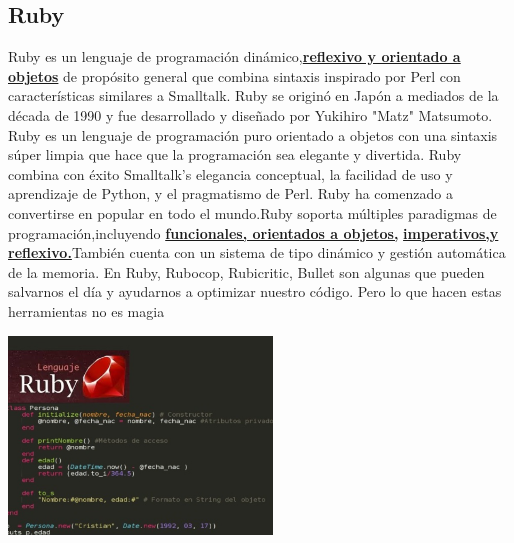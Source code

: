 \documentclass[twoside,twocolumn]{article}
\begin{document}
\subsection{Ruby}
Ruby es un lenguaje de programación dinámico,{\bf \underline {reflexivo y orientado a objetos}}  de propósito general que combina sintaxis
inspirado por Perl con características similares a Smalltalk. Ruby se originó en Japón a mediados de la década de 1990 y fue
desarrollado y diseñado por Yukihiro "Matz" Matsumoto. Ruby es un lenguaje de programación puro orientado a objetos
con una sintaxis súper limpia que hace que la programación sea elegante y divertida. Ruby combina con éxito Smalltalk's
elegancia conceptual, la facilidad de uso y aprendizaje de Python, y el pragmatismo de Perl. Ruby ha comenzado a convertirse en
popular en todo el mundo.Ruby soporta múltiples paradigmas de programación,incluyendo {\bf \underline {funcionales, orientados a objetos,}}
{\bf \underline {imperativos,y reflexivo.}}También cuenta con un sistema de tipo dinámico y gestión automática de la memoria.
En  Ruby,  Rubocop,  Rubicritic,  Bullet  son  algunas  que  pueden  salvarnos  el  día  y ayudarnos a optimizar nuestro código. Pero lo que hacen estas herramientas no es magia
\begin{center}
	\includegraphics[width=7cm]{./Imagenes/2} 
	\end{center}
	
\end{document}
